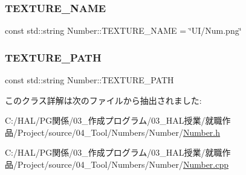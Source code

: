 \mbox{\label{class_number_a43c6583cef6d8d32b8de6683f80bdb59}} 
\subsubsection{\texorpdfstring{T\+E\+X\+T\+U\+R\+E\+\_\+\+N\+A\+ME}{TEXTURE\_NAME}}
{\footnotesize\ttfamily const std\+::string Number\+::\+T\+E\+X\+T\+U\+R\+E\+\_\+\+N\+A\+ME = \char`\"{}UI/Num.\+png\char`\"{}\hspace{0.3cm}{\ttfamily [static]}}

\mbox{\label{class_number_a0018ed63d70f4dde3c64bf99df7978ce}} 
\subsubsection{\texorpdfstring{T\+E\+X\+T\+U\+R\+E\+\_\+\+P\+A\+TH}{TEXTURE\_PATH}}
{\footnotesize\ttfamily const std\+::string Number\+::\+T\+E\+X\+T\+U\+R\+E\+\_\+\+P\+A\+TH\hspace{0.3cm}{\ttfamily [static]}}



このクラス詳解は次のファイルから抽出されました\+:\begin{DoxyCompactItemize}
\item 
C\+:/\+H\+A\+L/\+P\+G関係/03\+\_\+作成プログラム/03\+\_\+\+H\+A\+L授業/就職作品/\+Project/source/04\+\_\+\+Tool/\+Numbers/\+Number/\mbox{\hyperlink{_number_8h}{Number.\+h}}\item 
C\+:/\+H\+A\+L/\+P\+G関係/03\+\_\+作成プログラム/03\+\_\+\+H\+A\+L授業/就職作品/\+Project/source/04\+\_\+\+Tool/\+Numbers/\+Number/\mbox{\hyperlink{_number_8cpp}{Number.\+cpp}}\end{DoxyCompactItemize}
